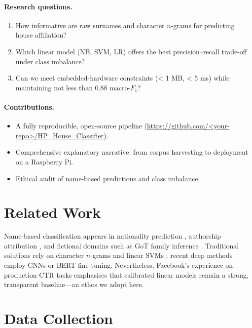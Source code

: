 \documentclass[12pt,a4paper]{article}
\begin{document}
\paragraph{Research questions.}
\begin{enumerate}[label=Q\arabic*,leftmargin=2em]
  \item How informative are raw surnames and character $n$-grams for
        predicting house affiliation?
  \item Which linear model (NB, SVM, LR) offers the best precision–recall
        trade-off under class imbalance?
  \item Can we meet embedded-hardware constraints (< 1 MB, < 5 ms) while
        maintaining not less than 0.88 macro-\(F_{1}\)?
\end{enumerate}

\paragraph{Contributions.}
\begin{itemize}[leftmargin=1.8em]
  \item A fully reproducible, open-source pipeline
        (\url{https://github.com/<your-repo>/HP_House_Classifier}).
  \item Comprehensive explanatory narrative: from corpus harvesting to
        deployment on a Raspberry Pi.
  \item Ethical audit of name-based predictions and class imbalance.
\end{itemize}

\section{Related Work}\label{sec:related}

Name-based classification appears in nationality prediction
\cite{Liu2013}, authorship attribution \cite{Juola2008}, and fictional
domains such as GoT family inference \cite{Siew2019}.  Traditional
solutions rely on character $n$-grams and linear SVMs \cite{Peng2003};
recent deep methods employ CNNs \cite{Kim2014} or BERT fine-tuning.
Nevertheless, Facebook’s experience on production CTR tasks
\cite{He2014} emphasises that calibrated linear models remain a strong,
transparent baseline—an ethos we adopt here.

\section{Data Collection}\label{sec:data}
\end{document}
